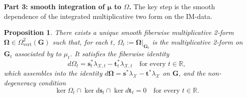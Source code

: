 \documentclass[reqno]{amsart}
\theoremstyle{plain}
\newtheorem{Prop}[Thm]{Proposition}
\theoremstyle{definition}
\newcommand{\R}{\mathbb{R}}
\begin{document}
\noindent\textbf{Part 3: smooth integration of $\mathbf{\mu}$ to $\Omega$.}
The key step is the smooth dependence of the integrated multiplicative two form on the IM-data. 

\begin{Prop}\label{prop:Omega-smooth}
There exists a unique smooth fiberwise multiplicative 2-form
$\boldsymbol{\Omega} \in \Omega^2_{\mathrm{vert}}(\mathbf{G})$ such that, for
each $t$, $\Omega_t := \boldsymbol{\Omega}|_{\mathbf{G}_t}$ is the
multiplicative 2-form on $\mathbf{G}_t$ associated by
\cite{bursztyn2004integration} to $\mu_t$. It satisfies the fiberwise identity
\begin{equation}\label{eq:twist-fiberwise}
d\Omega_t = \mathbf{s}_t^* \lambda_{\mathcal{X}, t}
- \mathbf{t}_t^* \lambda_{\mathcal{X}, t}
\quad \text{for every } t \in \R,
\end{equation}
which assembles into the identity
$d\boldsymbol{\Omega}
= \mathbf{s}^* \lambda_{\mathcal{X}} - \mathbf{t}^* \lambda_{\mathcal{X}}$
on $\mathbf{G}$, and the non-degeneracy condition
\begin{equation} \label{non-degen}
\ker \Omega_t \cap \ker d\mathbf{s}_t \cap \ker d\mathbf{t}_t = 0
\quad \text{for every } t \in \R.
\end{equation}
\end{Prop}
\end{document}
